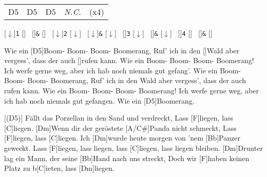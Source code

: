 \begin{guitar}
	 
	
	 \vspace*{-1.5mm}
	{\footnotesize\begin{tabular}{l|l|l|l l}
			D5 & D5 & D5 & \textit{N.C.} & (x4)
	\end{tabular}}\hspace*{\fill}%
		[$\downarrow$]{{\footnotesize\texttt{1}}}%
		[]{{\footnotesize\texttt{~}}}%
		[]{{\footnotesize\texttt{\&}}}%
		[]{{\footnotesize\texttt{~}}}%
		[$\downarrow$]{{\footnotesize\texttt{2}}}%
		[$\downarrow$]{{\footnotesize\texttt{~}}}%
		[$\downarrow$]{{\footnotesize\texttt{\&}}}%
		[$\downarrow$]{{\footnotesize\texttt{~}}}%
		[]{{\footnotesize\texttt{3}}}%
		[$\downarrow$]{{\footnotesize\texttt{~}}}%
		[]{{\footnotesize\texttt{\&}}}%
		[$\downarrow$]{{\footnotesize\texttt{~}}}%
		[]{{\footnotesize\texttt{4}}}%
		[]{{\footnotesize\texttt{~}}}%
		[]{{\footnotesize\texttt{\&}}}%
		[]{{\footnotesize\texttt{~}}}
	
	Wie ein [D5]Boom- Boom- Boom- Boomerang,
	Ruf' ich in den []Wald aber vergess', dass der auch []rufen kann.
	Wie ein Boom- Boom- Boom- Boomerang!
	Ich werfe gerne weg, aber ich hab noch niemals gut gefang'.
	Wie ein Boom- Boom- Boom- Boomerang,
	Ruf' ich in den Wald aber vergess', dass der auch rufen kann.
	Wie ein Boom- Boom- Boom- Boomerang!
	Ich werfe gerne weg, aber ich hab noch niemals gut gefangen.
	Wie ein [D5]Boomerang.
	
	[(D5)] Fällt das Porzellan in den Sand und verdreckt,
	Lass [F]liegen, lass [C]liegen.
	[Dm]Wenn dir der geröstete [A/C#]Panda nicht schmeckt,
	Lass [F]liegen, lass [C]liegen.
	Ich [Dm]wurde heute morgen von 'nem [Bb]Panzer geweckt.
	Lass [F]liegen, lass liegen, lass [C]liegen, lass liegen bleiben.
	[Dm]Drunter lag ein Mann, der seine [Bb]Hand nach uns streckt,
	Doch wir [F]haben keinen Platz zu b[C]ieten, lass [Dm]liegen.
\end{guitar}